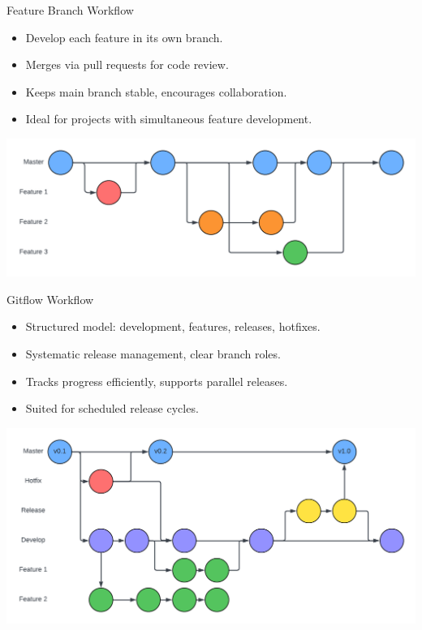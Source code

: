 \documentclass[aspectratio=169]{beamer}
\begin{document}
\begin{frame}{Feature Branch Workflow}
    \begin{itemize}
        \item Develop each feature in its own branch.
        \item Merges via pull requests for code review.
        \item Keeps main branch stable, encourages collaboration.
        \item Ideal for projects with simultaneous feature development.
    \end{itemize}
    \begin{center}
        \includegraphics[scale=.25]{feature_workflow_diagram.png}
    \end{center}
\end{frame}
\begin{frame}{Gitflow Workflow}
    \begin{itemize}
        \item Structured model: development, features, releases, hotfixes.
        \item Systematic release management, clear branch roles.
        \item Tracks progress efficiently, supports parallel releases.
        \item Suited for scheduled release cycles.
    \end{itemize}
    \begin{center}
        \includegraphics[scale=.2]{gitflow_workflow_diagram.png}
    \end{center}
\end{frame}
\end{document}
